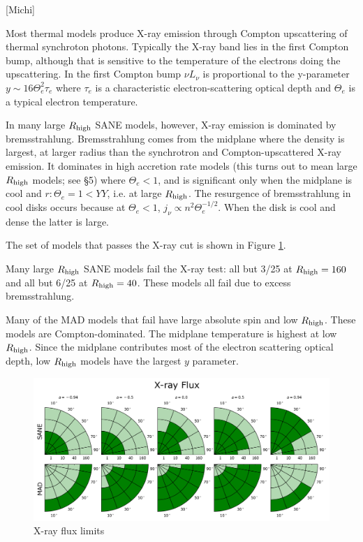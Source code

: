 
[Michi]

Most thermal models produce X-ray emission through Compton upscattering of thermal synchroton photons.  Typically the X-ray band lies in the first Compton bump, although that is sensitive to the temperature of the electrons doing the upscattering.  In the first Compton bump $\nu L_\nu$ is proportional to the y-parameter $y \sim 16 \Theta_e^2 \tau_e$ where $\tau_e$ is a characteristic electron-scattering optical depth and $\Theta_e$ is a typical electron temperature.

In many large $R_\mathrm{high}$ SANE models, however, X-ray emission is dominated by bremsstrahlung.  Bremsstrahlung comes from the midplane where the density is largest, at larger radius than the synchrotron and Compton-upscattered X-ray emission.  It dominates in high accretion rate models (this turns out to mean large $R_\mathrm{high}$ models; see \S 5) where $\Theta_e < 1$, and is significant only when the midplane is cool and $r: \Theta_e = 1 < YY$, i.e. at large $R_\mathrm{high}$.  The resurgence of bremsstrahlung in cool disks occurs because at $\Theta_e < 1$, $j_\nu \propto n^2 \Theta_e^{-1/2}$.  When the disk is cool and dense the latter is large.

The set of models that passes the X-ray cut is shown in Figure \ref{fig:cmp_xray_flux}.

Many large $R_\mathrm{high}$ SANE models fail the X-ray test: all but 3/25 at $R_\mathrm{high} = 160$ and all but 6/25 at $R_\mathrm{high} = 40$.  These models all fail due to excess bremsstrahlung.

Many of the MAD models that fail have large absolute spin and low $R_\mathrm{high}$.  These models are Compton-dominated.  The midplane temperature is highest at low $R_\mathrm{high}$.  Since the midplane contributes most of the electron scattering optical depth, low $R_\mathrm{high}$ models have the largest $y$ parameter.

\begin{figure}
  \centering
  \includegraphics[width=\columnwidth]{./figures/Xray_flux_Constraints.png}
  \caption{X-ray flux limits}
  \label{fig:cmp_xray_flux}
\end{figure}

